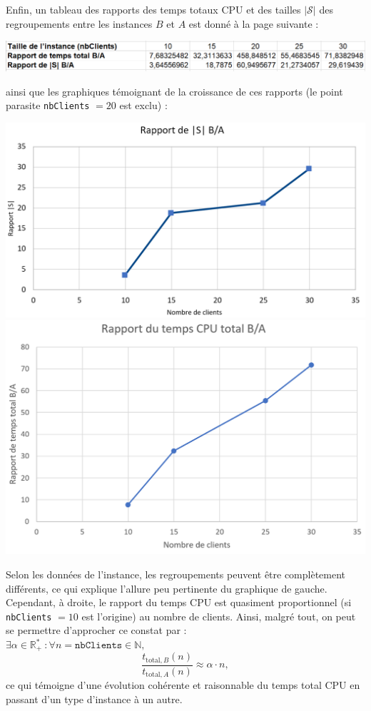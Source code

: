 \documentclass[french, 11pt, a4paper]{article} %
\newcommand{\Sc}{\mathcal{S}} %
\newcommand{\N}{\mathbb{N}}
\newcommand{\R}{\mathbb{R}^*_+}
\newcommand{\smb}{\smallbreak}
\begin{document}
\smb Enfin, un tableau des rapports des temps totaux CPU et des tailles $|\Sc|$ des regroupements entre les instances $B$ et $A$
est donné à la page suivante :

\begin{center}
    \includegraphics[scale=0.60]{Ratios.PNG}
\end{center}

ainsi que les graphiques témoignant de la croissance de ces rapports (le point parasite \verb+nbClients+ $=20$ est exclu) :
\begin{center}
    \includegraphics[scale=0.340]{GraphRatioSCallig.PNG}    
    \includegraphics[scale=0.340]{GraphRatioTps.PNG}
\end{center}

Selon les données de l'instance, les regroupements peuvent être complètement différents, ce qui explique
l'allure peu pertinente du graphique de gauche.
\smb Cependant, à droite, le rapport du temps CPU est quasiment proportionnel (si \verb+nbClients+ $=10$ est l'origine)
au nombre de clients. Ainsi, malgré tout, on peut se permettre d'approcher ce constat par : \\ $\exists \alpha \in \R \: : \forall n = \texttt{nbClients} \in \N,$
\[ \dfrac{t_{\text{total},B}(n)}{t_{\text{total},A}(n)} \approx \alpha \cdot n , \]
ce qui témoigne d'une évolution cohérente et raisonnable du temps total CPU en passant d'un type d'instance à un autre.
\end{document}

